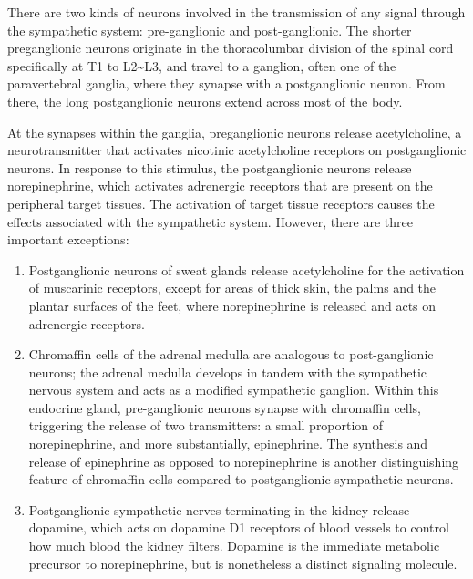 There are two kinds of neurons involved in the transmission of any signal through the sympathetic system: pre-ganglionic and post-ganglionic. The shorter preganglionic neurons originate in the thoracolumbar division of the spinal cord specifically at T1 to L2\textasciitilde{}L3, and travel to a ganglion, often one of the paravertebral ganglia, where they synapse with a postganglionic neuron. From there, the long postganglionic neurons extend across most of the body.

At the synapses within the ganglia, preganglionic neurons release acetylcholine, a neurotransmitter that activates nicotinic acetylcholine receptors on postganglionic neurons. In response to this stimulus, the postganglionic neurons release norepinephrine, which activates adrenergic receptors that are present on the peripheral target tissues. The activation of target tissue receptors causes the effects associated with the sympathetic system. However, there are three important exceptions:

\begin{enumerate}
\def\labelenumi{\arabic{enumi}.}
\tightlist
\item
  Postganglionic neurons of sweat glands release acetylcholine for the activation of muscarinic receptors, except for areas of thick skin, the palms and the plantar surfaces of the feet, where norepinephrine is released and acts on adrenergic receptors.
\item
  Chromaffin cells of the adrenal medulla are analogous to post-ganglionic neurons; the adrenal medulla develops in tandem with the sympathetic nervous system and acts as a modified sympathetic ganglion. Within this endocrine gland, pre-ganglionic neurons synapse with chromaffin cells, triggering the release of two transmitters: a small proportion of norepinephrine, and more substantially, epinephrine. The synthesis and release of epinephrine as opposed to norepinephrine is another distinguishing feature of chromaffin cells compared to postganglionic sympathetic neurons.
\item
  Postganglionic sympathetic nerves terminating in the kidney release dopamine, which acts on dopamine D1 receptors of blood vessels to control how much blood the kidney filters. Dopamine is the immediate metabolic precursor to norepinephrine, but is nonetheless a distinct signaling molecule.
\end{enumerate}

